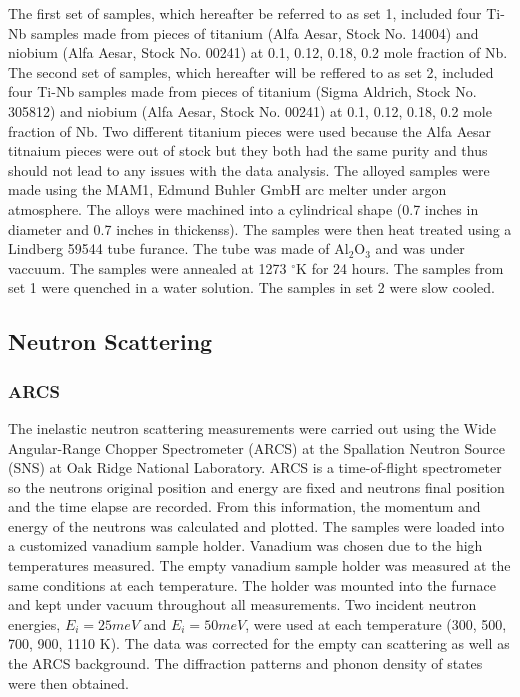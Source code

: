The first set of samples, which hereafter be referred to as set 1, included four Ti-Nb samples made from pieces of titanium (Alfa Aesar, Stock No. 14004) and niobium (Alfa Aesar, Stock No. 00241) at 0.1, 0.12, 0.18, 0.2 mole fraction of Nb. The second set of samples, which hereafter will be reffered to as set 2, included four Ti-Nb samples made from pieces of titanium (Sigma Aldrich, Stock No. 305812) and niobium (Alfa Aesar, Stock No. 00241) at 0.1, 0.12, 0.18, 0.2 mole fraction of Nb. Two different titanium pieces were used because the Alfa Aesar titnaium pieces were out of stock but they both had the same purity and thus should not lead to any issues with the data analysis. The alloyed samples were made using the MAM1, Edmund Buhler GmbH arc melter under argon atmosphere. The alloys were machined into a cylindrical shape (0.7 inches in diameter and 0.7 inches in thickenss). The samples were then heat treated using a Lindberg 59544 tube furance. The tube was made of Al$_{2}$O$_{3}$ and was under vaccuum. The samples were annealed at 1273 $^\circ$K for 24 hours. The samples from set 1 were quenched in a water solution. The samples in set 2 were slow cooled. 

\subsection{Neutron Scattering}

\subsubsection{ARCS}

The inelastic neutron scattering measurements were carried out using the Wide Angular-Range Chopper Spectrometer (ARCS) at the Spallation Neutron Source (SNS) at Oak Ridge National Laboratory. ARCS is a time-of-flight spectrometer so the neutrons original position and energy are fixed and neutrons final position and the time elapse are recorded. From this information, the momentum and energy of the neutrons was calculated and plotted. The samples were loaded into a customized vanadium sample holder. Vanadium was chosen due to the high temperatures measured. The empty vanadium sample holder was measured at the same conditions at each temperature. The holder was mounted into the furnace and kept under vacuum throughout all measurements. Two incident neutron energies, $E_{i} = 25 meV$ and $E_{i} = 50 meV$, were used at each temperature (300, 500, 700, 900, 1110 K). The data was corrected for the empty can scattering as well as the ARCS background. The diffraction patterns and phonon density of states were then obtained.

